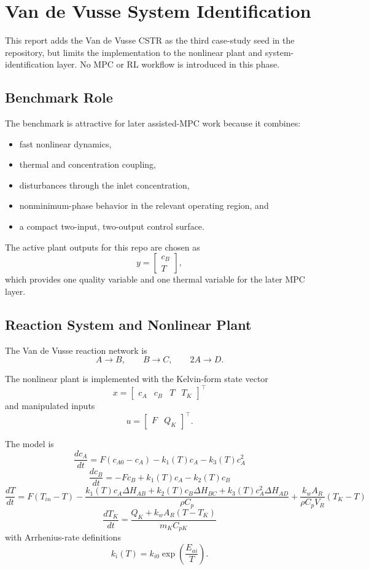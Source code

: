 \section{Van de Vusse System Identification}

This report adds the Van de Vusse CSTR as the third case-study seed in the repository, but limits the implementation to the nonlinear plant and system-identification layer. No MPC or RL workflow is introduced in this phase.

\subsection{Benchmark Role}

The benchmark is attractive for later assisted-MPC work because it combines:
\begin{itemize}
    \item fast nonlinear dynamics,
    \item thermal and concentration coupling,
    \item disturbances through the inlet concentration,
    \item nonminimum-phase behavior in the relevant operating region, and
    \item a compact two-input, two-output control surface.
\end{itemize}

The active plant outputs for this repo are chosen as
\[
y = \begin{bmatrix} c_B \\ T \end{bmatrix},
\]
which provides one quality variable and one thermal variable for the later MPC layer.

\subsection{Reaction System and Nonlinear Plant}

The Van de Vusse reaction network is
\[
A \rightarrow B,\qquad
B \rightarrow C,\qquad
2A \rightarrow D.
\]

The nonlinear plant is implemented with the Kelvin-form state vector
\[
x = \begin{bmatrix} c_A & c_B & T & T_K \end{bmatrix}^\top
\]
and manipulated inputs
\[
u = \begin{bmatrix} F & Q_K \end{bmatrix}^\top.
\]

The model is
\[
\frac{dc_A}{dt} = F(c_{A0} - c_A) - k_1(T)c_A - k_3(T)c_A^2
\]
\[
\frac{dc_B}{dt} = -Fc_B + k_1(T)c_A - k_2(T)c_B
\]
\[
\frac{dT}{dt} = F(T_{in} - T)
- \frac{k_1(T)c_A \Delta H_{AB} + k_2(T)c_B \Delta H_{BC} + k_3(T)c_A^2 \Delta H_{AD}}{\rho C_p}
+ \frac{k_w A_R}{\rho C_p V_R}(T_K - T)
\]
\[
\frac{dT_K}{dt} = \frac{Q_K + k_w A_R(T - T_K)}{m_K C_{pK}}
\]
with Arrhenius-rate definitions
\[
k_i(T) = k_{i0}\exp\!\left(\frac{E_{ai}}{T}\right).
\]

